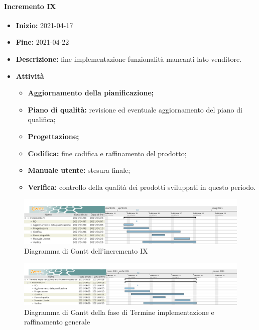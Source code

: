 \paragraph[Incremento IX]{Incremento IX}
\begin{itemize}
    \item [] \textbf{Inizio:} 2021-04-17
    \item [] \textbf{Fine:} 2021-04-22
    \item [] \textbf{Descrizione:} fine implementazione funzionalità mancanti lato venditore.
    \item [] \textbf{Attività}
          \begin{itemize}
              \item \textbf{Aggiornamento della pianificazione;}
              \item \textbf{Piano di qualità:} revisione ed eventuale aggiornamento del piano di qualifica;
              \item \textbf{Progettazione;}
              \item \textbf{Codifica:} fine codifica e raffinamento del prodotto;
              \item \textbf{Manuale utente:} stesura finale;
              \item \textbf{Verifica:} controllo della qualità dei prodotti sviluppati in questo periodo.
          \end{itemize}
\end{itemize}

\begin{figure}[H]
    \centering
    \includegraphics[width=1\linewidth]{res/images/pianificazione/incremento_9.png}
    \caption{Diagramma di Gantt dell'incremento IX}
    \label{fig:_Gantt incremento IX}
\end{figure}

\begin{figure}[H]
    \centering
    \includegraphics[width=1\linewidth]{res/images/pianificazione/termine_implementazione_e_raffinamento_generale.png}
    \caption{Diagramma di Gantt della fase di Termine implementazione e raffinamento generale}
    \label{fig:_Gantt termine implementazione e raffinamento generale}
\end{figure}


